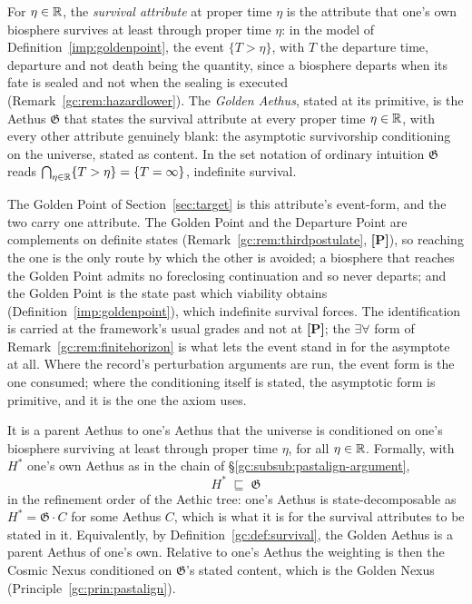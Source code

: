 \begin{definition}\label{gc:def:survival}
For $\eta\in\mathbb{R}$, the \emph{survival attribute} at proper time $\eta$ is
the attribute that one's own biosphere survives at least through proper
time $\eta$: in the model of Definition~\ref{imp:goldenpoint}, the event
$\{T>\eta\}$, with $T$ the departure time, departure and not death being
the quantity, since a biosphere departs when its fate is sealed and not
when the sealing is executed (Remark~\ref{gc:rem:hazardlower}). The
\emph{Golden Aethus}, stated at its primitive, is the Aethus $\mathfrak G$
that states the survival attribute at every proper time $\eta\in\mathbb{R}$,
with every other attribute genuinely blank: the asymptotic survivorship
conditioning on the universe, stated as content. In the set notation of
ordinary intuition $\mathfrak G$ reads
$\bigcap_{\eta\in\mathbb{R}}\{T>\eta\}=\{T=\infty\}$, indefinite survival.
\end{definition}

\noindent The Golden Point of Section~\ref{sec:target} is this
attribute's event-form, and the two carry one attribute. The Golden Point
and the Departure Point are complements on definite states
(Remark~\ref{gc:rem:thirdpostulate}, \textbf{[P]}), so reaching the one is
the only route by which the other is avoided; a biosphere that reaches
the Golden Point admits no foreclosing continuation and so never
departs; and the Golden Point is the state past which viability obtains
(Definition~\ref{imp:goldenpoint}), which indefinite survival forces. The
identification is carried at the framework's usual grades and not at
\textbf{[P]}; the $\exists\forall$ form of
Remark~\ref{gc:rem:finitehorizon} is what lets the event stand in for the
asymptote at all. Where the record's perturbation arguments are run, the
event form is the one consumed; where the conditioning itself is stated,
the asymptotic form is primitive, and it is the one the axiom uses.

\begin{axiom}
\label{gc:ax:golden}
It is a parent Aethus to one's Aethus that the universe is conditioned
on one's biosphere surviving at least through proper time $\eta$, for
all $\eta\in\mathbb{R}$. Formally, with $H^{\ast}$ one's own Aethus as in the
chain of \S\ref{gc:subsub:pastalign-argument},
\begin{equation}\label{gc:eq:goldenaxiom}
\boxed{\;H^{\ast}\;\sqsubseteq\;\mathfrak G\;}
\end{equation}
in the refinement order of the Aethic tree: one's Aethus is
state-decomposable as $H^{\ast}=\mathfrak G\cdot C$ for some Aethus $C$,
which is what it is for the survival attributes to be stated in it.
Equivalently, by Definition~\ref{gc:def:survival}, the Golden Aethus is
a parent Aethus of one's own. Relative to one's Aethus the weighting is
then the Cosmic Nexus conditioned on $\mathfrak G$'s stated content,
which is the Golden Nexus (Principle~\ref{gc:prin:pastalign}).
\end{axiom}

